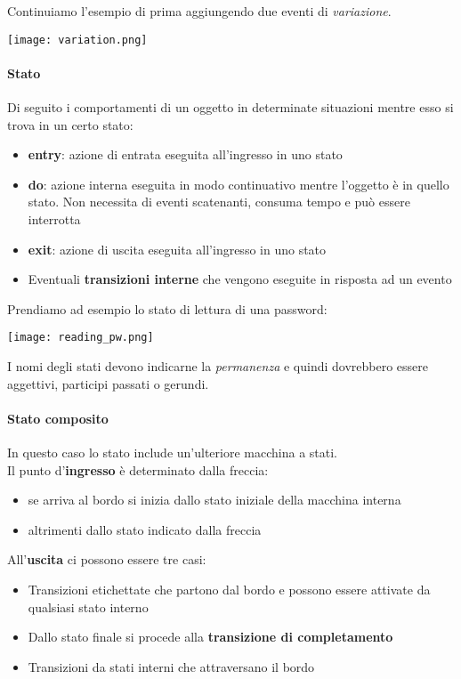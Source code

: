 \begin{example}
	Continuiamo l'esempio di prima aggiungendo due eventi di \textit{variazione}.
	\begin{center}
		\texttt{[image: variation.png]}
	\end{center}
\end{example}

\paragraph{Stato}
Di seguito i comportamenti di un oggetto in determinate situazioni mentre esso si trova in un certo stato:
\begin{itemize}
	\item \textbf{entry}: azione di entrata eseguita all'ingresso in uno stato
	\item \textbf{do}: azione interna eseguita in modo continuativo mentre l'oggetto è in quello stato. Non necessita di eventi scatenanti, consuma tempo e può essere interrotta
	\item \textbf{exit}: azione di uscita eseguita all'ingresso in uno stato
	\item Eventuali \textbf{transizioni interne} che vengono eseguite in risposta ad un evento
\end{itemize}
\newpage
\begin{example}
	Prendiamo ad esempio lo stato di lettura di una password:
	\begin{center}
		\texttt{[image: reading\_pw.png]}
	\end{center}
\end{example}

\begin{note}
	I nomi degli stati devono indicarne la \textit{permanenza} e quindi dovrebbero essere aggettivi, participi passati o gerundi.
\end{note}

\paragraph{Stato composito}
In questo caso lo stato include un'ulteriore macchina a stati.\\
Il punto d'\textbf{ingresso} è determinato dalla freccia:
\begin{itemize}
	\item se arriva al bordo si inizia dallo stato iniziale della macchina interna
	\item altrimenti dallo stato indicato dalla freccia
\end{itemize}
 All'\textbf{uscita} ci possono essere tre casi:
 \begin{itemize}
 	\item Transizioni etichettate che partono dal bordo e possono essere attivate da qualsiasi stato interno
 	\item Dallo stato finale si procede alla \textbf{transizione di completamento}
 	\item Transizioni da stati interni che attraversano il bordo
 \end{itemize}
 

